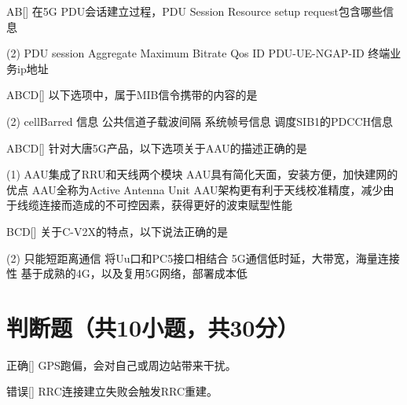 \begin{choice}{\;AB\;}[]
    在5G PDU会话建立过程，PDU Session Resource setup request包含哪些信息
    \begin{tasks}(2)
        \task PDU session Aggregate Maximum Bitrate
        \task Qos ID
        \task PDU-UE-NGAP-ID
        \task 终端业务ip地址
    \end{tasks}
\end{choice}

\begin{choice}{\;ABCD\;}[]
    以下选项中，属于MIB信令携带的内容的是
    \begin{tasks}(2)
        \task cellBarred 信息
        \task 公共信道子载波间隔
        \task 系统帧号信息
        \task 调度SIB1的PDCCH信息
    \end{tasks}
\end{choice}

\begin{choice}{\;ABCD\;}[]
    针对大唐5G产品，以下选项关于AAU的描述正确的是
    \begin{tasks}(1)
        \task AAU集成了RRU和天线两个模块
        \task AAU具有简化天面，安装方便，加快建网的优点
        \task AAU全称为Active Antenna Unit
        \task AAU架构更有利于天线校准精度，减少由于线缆连接而造成的不可控因素，获得更好的波束赋型性能
    \end{tasks}
\end{choice}

\begin{choice}{\;BCD\;}[]
    关于C-V2X的特点，以下说法正确的是
    \begin{tasks}(2)
        \task 只能短距离通信
        \task 将Uu口和PC5接口相结合
        \task 5G通信低时延，大带宽，海量连接性
        \task 基于成熟的4G，以及复用5G网络，部署成本低
    \end{tasks}
\end{choice}




\section{判断题（共10小题，共30分）}

\begin{choice}{\;正确\;}[]
    GPS跑偏，会对自己或周边站带来干扰。
\end{choice}


\begin{choice}{\;错误\;}[]
    RRC连接建立失败会触发RRC重建。
\end{choice}

